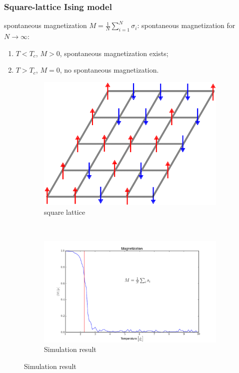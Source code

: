 \documentclass[notheorems]{beamer}
\begin{document}
\begin{frame}
\frametitle{Square-lattice Ising model}
\begin{block}{spontaneous magnetization}
	$M = \frac{1}{N} \sum_{i=1}^N \sigma_i$: spontaneous magnetization for $N\to \infty$:
	\begin{enumerate}
		\item $T< T_c$, $M>0$, spontaneous magnetization exists;
		\item $T> T_c$, $M=0$, no spontaneous magnetization.
	\end{enumerate}
\end{block}
\begin{figure}
	\centering
	\begin{subfigure}{0.45\textwidth}
		\includegraphics[width=\textwidth]{square-lattice.png}
		\caption{square lattice}
	\end{subfigure}~
	\begin{subfigure}{0.53\textwidth}
		\includegraphics[width=\textwidth]{monte-carlo-ising-6.png}
		\caption{Simulation result}
	\end{subfigure}
\end{figure}

\end{frame}
\end{document}
